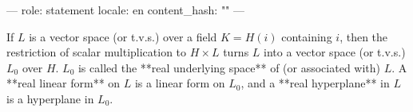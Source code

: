 ---
role: statement
locale: en
content_hash: ""
---

If $L$ is a vector space (or t.v.s.) over a field $K = H(i)$ containing $i$, then the restriction of scalar multiplication to $H \times L$ turns $L$ into a vector space (or t.v.s.) $L_0$ over $H$. $L_0$ is called the **real underlying space** of (or associated with) $L$. A **real linear form** on $L$ is a linear form on $L_0$, and a **real hyperplane** in $L$ is a hyperplane in $L_0$.
